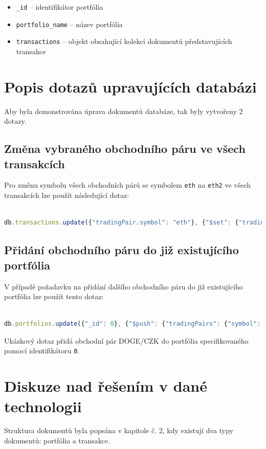 \documentclass[12pt, a4paper]{article}
\let\oldsection\section
\renewcommand\section{\clearpage\oldsection}
\begin{document}
\begin{itemize}
    \item \texttt{_id} -- identifikátor portfólia
    \item \texttt{portfolio_name} -- název portfólia
    \item \texttt{transactions} -- objekt obsahující kolekci dokumentů představujících transakce
\end{itemize}


\section{Popis dotazů upravujících databázi}
Aby byla demonstrována úprava dokumentů databáze, tak byly vytvořeny 2 dotazy.

\subsection{Změna vybraného obchodního páru ve všech transakcích}
Pro změnu symbolu všech obchodních párů se symbolem \texttt{eth} na \texttt{eth2} ve všech transakcích lze použít následující dotaz:

\begin{lstlisting}[language=JavaScript]

db.transactions.update({"tradingPair.symbol": "eth"}, {"$set": {"tradingPair.symbol":"eth2"}}, {"multi": true})

\end{lstlisting}



\subsection{Přidání obchodního páru do již existujícího portfólia}
V případě požadavku na přidání dalšího obchodního páru do již existujícího portfólia lze použít tento dotaz:

\begin{lstlisting}[language=JavaScript]

db.portfolios.update({"_id": 0}, {"$push": {"tradingPairs": {"symbol": "doge", "currency": "czk"}}})

\end{lstlisting}

Ukázkový dotaz přidá obchodní pár DOGE/CZK do portfólia specifikovaného pomocí identifikátoru \texttt{0}.


\section{Diskuze nad řešením v dané technologii}
Struktura dokumentů byla popsána v kapitole č. 2, kdy existují dva typy dokumentů: portfólia a transakce. 
\end{document}

